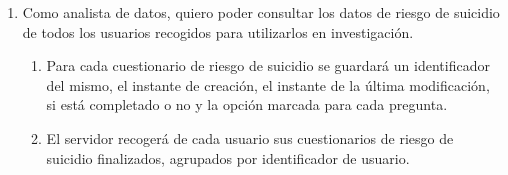         \begin{enumerate}[resume=req-usuario,label=\textbf{\texttt{RU-\arabic*}}]
            \item Como analista de datos, quiero poder consultar los datos de riesgo de suicidio  de todos los usuarios recogidos para utilizarlos en investigación.
            \begin{enumerate}[resume=req-funcionales,label=\textbf{\texttt{RF-\arabic*}}]
                \item Para cada cuestionario de riesgo de suicidio se guardará un identificador del mismo, el instante de creación, el instante de la última modificación, si está completado o no y la opción marcada para cada pregunta.
                \item El servidor recogerá de cada usuario sus cuestionarios de riesgo de suicidio finalizados, agrupados por identificador de usuario.
            \end{enumerate}
        \end{enumerate}
